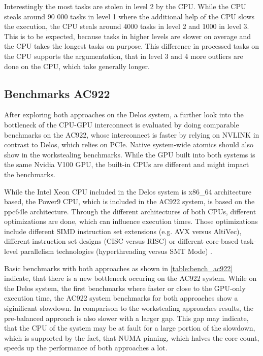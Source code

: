 Interestingly the most tasks are stolen in level 2 by the CPU. While the CPU steals around 90 000 tasks in level 1 where the additional help of the CPU slows the execution, the CPU steals around 4000 tasks in level 2 and 1000 in level 3. This is to be expected, because tasks in higher levels are slower on average and the CPU takes the longest tasks on purpose. This difference in processed tasks on the CPU supports the argumentation, that in level 3 and 4 more outliers are done on the CPU, which take generally longer.

\subsection{Benchmarks AC922}
After exploring both approaches on the Delos system, a further look into the bottleneck of the CPU-GPU interconnect is evaluated by doing comparable benchmarks on the AC922, whose interconnect is faster by relying on NVLINK in contrast to Delos, which relies on PCIe. Native system-wide atomics should also show in the workstealing benchmarks.
While the GPU built into both systems is the same Nvidia V100 GPU, the built-in CPUs are different and might impact the benchmarks.

While the Intel Xeon CPU included in the Delos system is x86\_64 architecture based, the Power9 CPU, which is included in the AC922 system, is based on the ppc64le architecture. Through the different architectures of both CPUs, different optimizations are done, which can influence execution times. Those optimizations include different SIMD instruction set extensions (e.g. AVX versus AltiVec), different instruction set designs (CISC versus RISC) or different core-based task-level parallelism technologies (hyperthreading versus SMT Mode) \cite{AnalysisX86Vs}.



Basic benchmarks with both approaches as shown in \ref{table:bench_ac922} indicate, that there is a new bottleneck occuring on the AC922 system. While on the Delos system, the first benchmarks where faster or close to the GPU-only execution time, the AC922 system  benchmarks for both approaches show a siginificant slowdown. In comparison to the workstealing approaches results, the pre-balanced approach is also slower with a larger gap. This gap may indicate, that the CPU of the system may be at fault for a large portion of the slowdown, which is supported by the fact, that NUMA pinning, which halves the core count, speeds up the performance of both approaches a lot.


